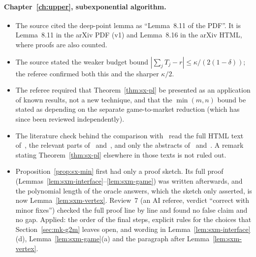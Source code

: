 \paragraph{Chapter~\ref{ch:upper}, subexponential algorithm.}
\begin{itemize}[nosep]
\item The source cited the deep-point lemma as ``Lemma~8.11 of the PDF''. It is Lemma~8.11 in the arXiv PDF (v1) and Lemma~8.16 in the arXiv HTML, where proofs are also counted.
\item The source stated the weaker budget bound $|\sum_jT_j-r|\le\kappa/(2(1-\delta))$; the referee
confirmed both this and the sharper $\kappa/2$.
\item The referee required that Theorem~\ref{thm:sx-pl} be presented as an application of known results,
not a new technique, and that the $\min(m,n)$ bound be stated as depending on the separate game-to-market
reduction (which has since been reviewed independently).
\item The literature check behind the comparison with~\cite{glm26,hlsw25,cly26,fh26,haslebacher25} read
the full HTML text of~\cite{glm26}, the relevant parts of~\cite{cly26} and~\cite{fh26}, and only the
abstracts of~\cite{hlsw25} and~\cite{haslebacher25}. A remark stating Theorem~\ref{thm:sx-pl} elsewhere in
those texts is not ruled out.
\item Proposition~\ref{prop:sx-min} first had only a proof sketch. Its full proof
(Lemmas~\ref{lem:sxm-interface}--\ref{lem:sxm-game}) was written afterwards, and the polynomial length
of the oracle answers, which the sketch only asserted, is now Lemma~\ref{lem:sxm-vertex}. Review~7 (an AI
referee, verdict ``correct with minor fixes'') checked the full proof line by line and found no false
claim and no gap. Applied: the order of the final steps, explicit rules for the choices that
Section~\ref{sec:mk-g2m} leaves open, and wording in Lemma~\ref{lem:sxm-interface}(d),
Lemma~\ref{lem:sxm-game}(a) and the paragraph after Lemma~\ref{lem:sxm-vertex}.
\end{itemize}

